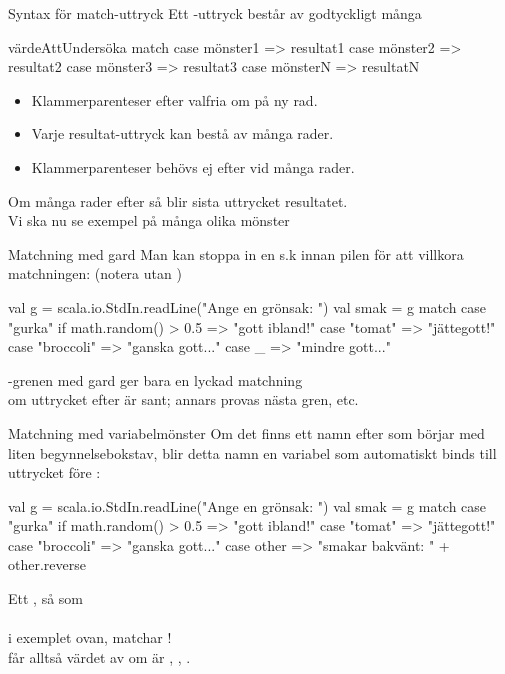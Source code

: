 \begin{Slide}{Syntax för match-uttryck}
Ett -uttryck består av godtyckligt många 
\begin{Code}
  värdeAttUndersöka match {
    case mönster1 => resultat1
    case mönster2 => resultat2
    case mönster3 => resultat3
    case mönsterN => resultatN
  }
\end{Code}
\begin{itemize}
  \item Klammerparenteser efter  valfria om  på ny rad.
  \item Varje resultat-uttryck kan bestå av många rader. 
  \item  Klammerparenteser behövs ej efter \code{=>} vid många rader. 
\end{itemize}
\vspace{1em}
Om många rader efter  så blir sista uttrycket resultatet. \\
Vi ska nu se exempel på många olika mönster 

\end{Slide}
  


\begin{Slide}{Matchning med gard}
Man kan stoppa in en s.k   innan pilen \code{=>} för att villkora matchningen: (notera  utan )
\begin{Code}
val g = scala.io.StdIn.readLine("Ange en grönsak: ")
val smak = g match 
  case "gurka" if math.random() > 0.5 => "gott ibland!"
  case "tomat" => "jättegott!"
  case "broccoli" => "ganska gott..."
  case _ => "mindre gott..."
\end{Code}
-grenen med gard ger bara en lyckad matchning \\ om uttrycket efter  är sant; annars provas nästa gren, etc.
\end{Slide}

\begin{Slide}{Matchning med variabelmönster}\SlideFontSmall
Om det finns ett namn efter  som börjar med liten begynnelsebokstav, blir detta namn en variabel som automatiskt binds till uttrycket före :

\begin{Code}
val g = scala.io.StdIn.readLine("Ange en grönsak: ")
val smak = g match 
  case "gurka" if math.random() > 0.5 => "gott ibland!"
  case "tomat" => "jättegott!"
  case "broccoli" => "ganska gott..."
  case other => "smakar bakvänt: " + other.reverse
\end{Code}

Ett  , så som \\  \\ i exemplet ovan, matchar ! \\ får alltså värdet av  om   är , , .

\end{Slide}


